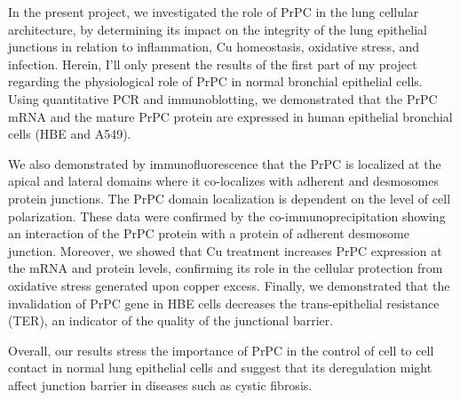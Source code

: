 In the present project, we investigated the role of PrPC in the lung cellular architecture, by determining its impact on the integrity of the lung epithelial junctions in relation to inflammation, Cu homeostasis, oxidative stress, and infection.
Herein, I’ll only present the results of the first part of my project regarding the physiological role of PrPC in normal bronchial epithelial cells. Using quantitative PCR and immunoblotting, we demonstrated that the PrPC mRNA and the mature PrPC protein are expressed in human epithelial bronchial cells (HBE and A549). 

We also demonstrated by immunofluorescence that the PrPC is localized at the apical and lateral domains where it co-localizes with adherent and desmosomes protein junctions. The PrPC domain localization is dependent on the level of cell polarization. These data were confirmed by the co-immunoprecipitation showing an interaction of the PrPC protein with a protein of adherent desmosome junction. Moreover, we showed that Cu treatment increases PrPC expression at the mRNA and protein levels, confirming its role in the cellular protection from oxidative stress generated upon copper excess. Finally, we demonstrated that the invalidation of PrPC gene in HBE cells decreases the trans-epithelial resistance (TER), an indicator of the quality of the junctional barrier. 

Overall, our results stress the importance of PrPC in the control of cell to cell contact in normal lung epithelial cells and suggest that its deregulation might affect junction barrier in diseases such as cystic fibrosis.


\endgroup

\vfill